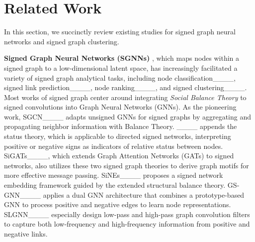 \section{Related Work}
In this section, we succinctly review existing studies for signed graph neural networks and signed graph clustering.

\textbf{Signed Graph Neural Networks (SGNNs)}
, which maps nodes within a signed graph to a low-dimensional latent space, has increasingly facilitated a variety of signed graph analytical tasks, including node classification____, signed link prediction____, node ranking____, and signed clustering____. 
Most works of signed graph center around integrating \textit{Social Balance Theory} to signed convolutions into Graph Neural Networks (GNNs). As the pioneering work, SGCN____ adapts unsigned GNNs for signed graphs by aggregating and propagating neighbor information with Balance Theory. 
____ appends the status theory, which is applicable to directed signed networks, interpreting positive or negative signs as indicators of relative status between nodes.
SiGATs____, which extends Graph Attention Networks (GATs) to signed networks, also utilizes these two signed graph theories to derive graph motifs for more effective message passing. %
SiNEs____ proposes a signed network embedding framework guided by the extended structural balance theory. 
GS-GNN____ applies a dual GNN architecture that combines a prototype-based GNN to process positive and negative edges to learn node representations. SLGNN____
especially design low-pass and high-pass graph convolution filters to capture both low-frequency and high-frequency information from positive and negative links. 

